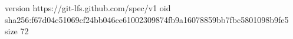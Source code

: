 version https://git-lfs.github.com/spec/v1
oid sha256:f67d04c51069cf24bb046ce61002309874fb9a16078859bb7fbc5801098b9fe5
size 72
